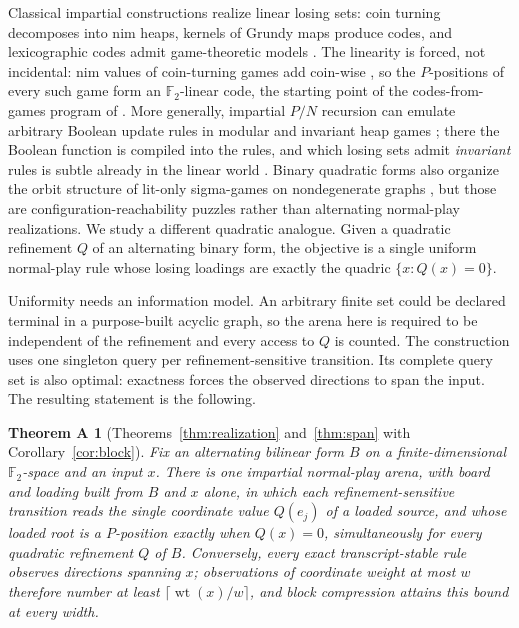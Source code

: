 \documentclass[11pt]{article}
\newtheorem*{thmA}{Theorem A}
\theoremstyle{definition}
\theoremstyle{remark}
\newcommand{\F}{\mathbb{F}}
\newcommand{\wt}{\operatorname{wt}}
\begin{document}
Classical impartial constructions realize linear losing sets: coin
turning decomposes into nim heaps, kernels of Grundy maps produce codes, and
lexicographic codes admit game-theoretic models
\cite{berlekampconwayguy1982,conwaysloane1986,fraenkel1996}.  The linearity
is forced, not incidental: nim values of coin-turning games add coin-wise
\cite{berlekampconwayguy1982}, so the $P$-positions of every such game form
an $\F_2$-linear code, the starting point of the codes-from-games program of
\cite{conwaysloane1986,fraenkel1996}.  More generally, impartial $P/N$
recursion can emulate arbitrary Boolean update rules in modular and
invariant heap games \cite{larssonwastlund2013}; there the Boolean function
is compiled into the rules, and which losing sets admit \emph{invariant}
rules is subtle already in the linear world \cite{ducheneparreaurigo2017}.  Binary quadratic forms also organize
the orbit structure of lit-only sigma-games on nondegenerate graphs
\cite{huang2015}, but those are configuration-reachability puzzles rather
than alternating normal-play realizations.  We study a different quadratic
analogue.  Given a quadratic refinement $Q$ of an alternating binary form,
the objective is a single uniform normal-play rule whose losing loadings are
exactly the quadric $\{x:Q(x)=0\}$.

Uniformity needs an information model.  An arbitrary finite set could be
declared terminal in a purpose-built acyclic graph, so the arena here is
required to be independent of the refinement and every access to $Q$ is
counted.  The construction uses one singleton query per
refinement-sensitive transition.  Its complete query set is also optimal:
exactness forces the observed directions to span the input.  The resulting
statement is the following.

\begin{thmA}[Theorems~\ref{thm:realization} and~\ref{thm:span} with
Corollary~\ref{cor:block}]
Fix an alternating bilinear form $B$ on a finite-dimensional $\F_2$-space
and an input $x$.  There is one impartial normal-play arena, with board and
loading built from $B$ and $x$ alone, in which each refinement-sensitive
transition reads the single coordinate value $Q(e_j)$ of a loaded source,
and whose loaded root is a $P$-position exactly when $Q(x)=0$,
simultaneously for every quadratic refinement $Q$ of $B$.  Conversely,
every exact transcript-stable rule observes directions spanning $x$;
observations of coordinate weight at most $w$ therefore number at least
$\lceil\wt(x)/w\rceil$, and block compression attains this bound at every
width.
\end{thmA}
\end{document}
